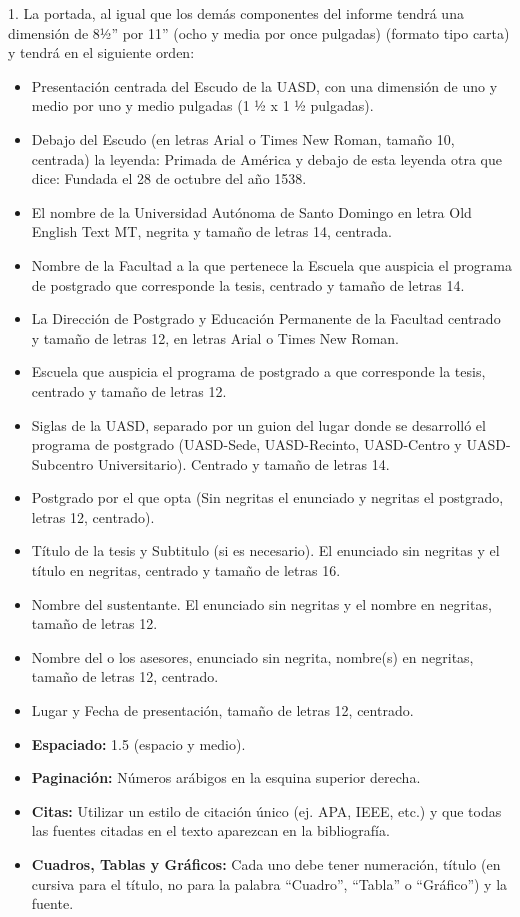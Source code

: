 \documentclass[12pt,a4paper]{article}
\begin{document}
1. La portada, al igual que los demás componentes del informe tendrá una dimensión de 8½”
por 11” (ocho y media por once pulgadas) (formato tipo carta) y tendrá en el siguiente
orden:


\begin{itemize}
    \item Presentación centrada del Escudo de la UASD, con una dimensión de uno y medio por uno
    y medio pulgadas (1 ½ x 1 ½ pulgadas).
    
    \item Debajo del Escudo (en letras Arial o Times New Roman, tamaño 10, centrada) la leyenda:
Primada de América y debajo de esta leyenda otra que dice: Fundada el 28 de octubre del
año 1538.
\item El nombre de la Universidad Autónoma de Santo Domingo en letra Old English Text MT,
negrita y tamaño de letras 14, centrada.
\item Nombre de la Facultad a la que pertenece la Escuela que auspicia el programa de postgrado
 que corresponde la tesis, centrado y tamaño de letras 14.
 \item La Dirección de Postgrado y Educación Permanente de la Facultad centrado y tamaño de
letras 12, en letras Arial o Times New Roman.
\item Escuela que auspicia el programa de postgrado a que corresponde la tesis, centrado y
tamaño de letras 12.
\item Siglas de la UASD, separado por un guion del lugar donde se desarrolló el programa de
postgrado (UASD-Sede, UASD-Recinto, UASD-Centro y UASD-Subcentro
Universitario). Centrado y tamaño de letras 14.
\item Postgrado por el que opta (Sin negritas el enunciado y negritas el postgrado, letras 12,
centrado).
\item Título de la tesis y Subtitulo (si es necesario). El enunciado sin negritas y el título en
negritas, centrado y tamaño de letras 16.
\item Nombre del sustentante. El enunciado sin negritas y el nombre en negritas, tamaño de letras
12.
\item Nombre del o los asesores, enunciado sin negrita, nombre(s) en negritas, tamaño de letras
12, centrado.

\item Lugar y Fecha de presentación, tamaño de letras 12, centrado.

    \item \textbf{Espaciado:} 1.5 (espacio y medio).
    \item \textbf{Paginación:} Números arábigos en la esquina superior derecha.
    \item \textbf{Citas:} Utilizar un estilo de citación único (ej. APA, IEEE, etc.) y que todas las fuentes citadas en el texto aparezcan en la bibliografía.
    \item \textbf{Cuadros, Tablas y Gráficos:} Cada uno debe tener numeración, título (en cursiva para el título, no para la palabra “Cuadro”, “Tabla” o “Gráfico”) y la fuente.
\end{itemize}
\end{document}
